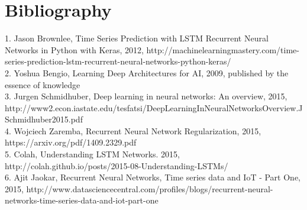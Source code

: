 \documentclass[prodmode,acmtecs]{acmsmall} %
\begin{document}
\newpage
\section{Bibliography}
1. Jason Brownlee, Time Series Prediction with LSTM Recurrent Neural Networks in Python with Keras, 2012, http://machinelearningmastery.com/time-series-prediction-lstm-recurrent-neural-networks-python-keras/ \\
2. Yoshua Bengio, Learning Deep Architectures for AI, 2009, published by the essence of knowledge \\
3. Jurgen Schmidhuber, Deep learning in neural networks: An overview, 2015, http://www2.econ.iastate.edu/tesfatsi/DeepLearningInNeuralNetworksOverview.JSchmidhuber2015.pdf \\
4. Wojciech Zaremba, Recurrent Neural Network Regularization, 2015, https://arxiv.org/pdf/1409.2329.pdf \\
5. Colah, Understanding LSTM Networks. 2015, http://colah.github.io/posts/2015-08-Understanding-LSTMs/\\
6. Ajit Jaokar, Recurrent Neural Networks, Time series data and IoT - Part One, 2015, http://www.datasciencecentral.com/profiles/blogs/recurrent-neural-networks-time-series-data-and-iot-part-one
\end{document}
